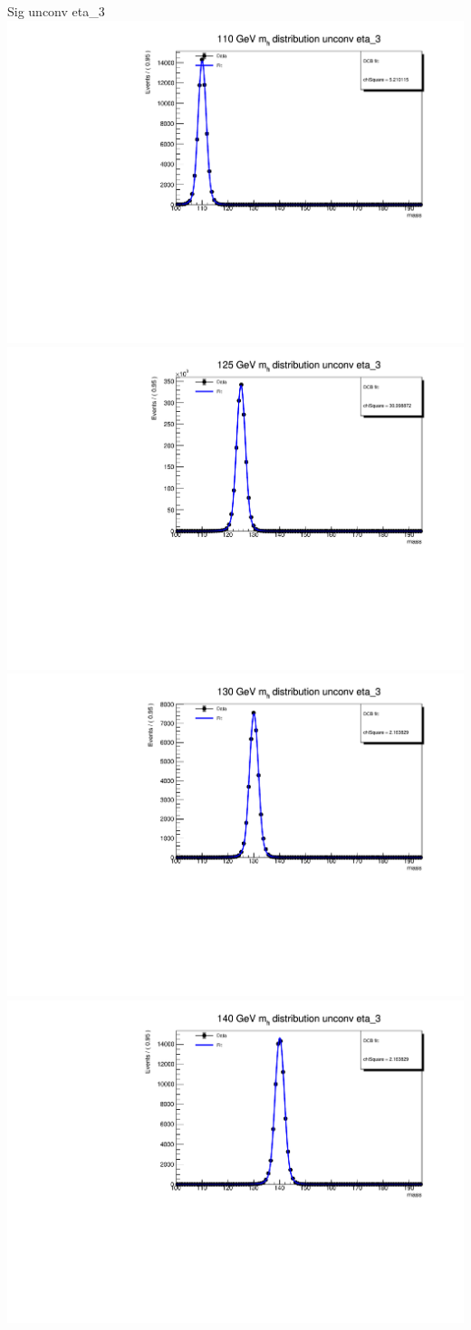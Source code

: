 \documentclass[10pt,UKenglish, leqno, xcolor = dvipsnames]{beamer}
\begin{document}
		\begin{frame}{Sig unconv eta\_3}
			\vfill
			\centering
			\includegraphics[width=.45\textwidth]{../images/week_10/PowhegPy8_NNLOPS_ggH110_unconv_eta_3_fit.pdf}
			\includegraphics[width=.45\textwidth]{../images/week_10/PowhegPy8_NNLOPS_ggH125_unconv_eta_3_fit.pdf}\\
			\includegraphics[width=.45\textwidth]{../images/week_10/PowhegPy8_NNLOPS_ggH130_unconv_eta_3_fit.pdf}
			\includegraphics[width=.45\textwidth]{../images/week_10/PowhegPy8_NNLOPS_ggH140_unconv_eta_3_fit.pdf}
			\vfill
		\end{frame}
	
\end{document}
